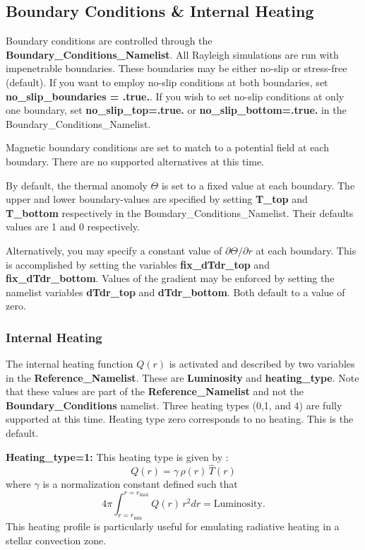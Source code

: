 \subsection{Boundary Conditions \& Internal Heating}\label{sec:boundary_conditions}
Boundary conditions are controlled through the \textbf{Boundary\_Conditions\_Namelist}. All Rayleigh simulations are run with impenetrable boundaries. These boundaries may be either no-slip or stress-free (default).  If you want to employ no-slip conditions at both boundaries, set \textbf{no\_slip\_boundaries = .true.}.  If you wish to set no-slip conditions at only one boundary, set \textbf{no\_slip\_top=.true.} or \textbf{no\_slip\_bottom=.true.} in the Boundary\_Conditions\_Namelist. 

Magnetic boundary conditions are set to match to a potential field at each boundary.  There are no supported alternatives at this time.

By default, the thermal anomoly $\Theta$ is set to a fixed value at each boundary.   The upper and lower boundary-values are specified by setting \textbf{T\_top} and \textbf{T\_bottom} respectively in the Boundary\_Conditions\_Namelist.  Their defaults values are 1 and 0 respectively.

Alternatively, you may specify a constant value of $\partial\Theta/\partial r$ at each boundary.  This is accomplished by setting the variables \textbf{fix\_dTdr\_top} and \textbf{fix\_dTdr\_bottom}.   Values of the gradient may be enforced by setting the namelist variables \textbf{dTdr\_top} and \textbf{dTdr\_bottom}.  Both default to a value of zero.
\subsubsection{Internal Heating}
The internal heating function $Q(r)$ is activated and described by two variables in the \textbf{Reference\_Namelist}.   These are \textbf{Luminosity} and \textbf{heating\_type}.  Note that these values are part of the \textbf{Reference\_Namelist} and not the \textbf{Boundary\_Conditions} namelist.  Three heating types (0,1, and 4) are fully supported at this time. Heating type zero corresponds to no heating.  This is the default.  


\textbf{Heating\_type=1:}
This heating type is given by :
\begin{equation}
\label{eq:heating}
Q(r)= \gamma\,\hat{\rho}(r)\, \hat{T}(r) 
\end{equation}
where $\gamma$ is a normalization constant defined such that 
\begin{equation}
\label{eq:lum}
4\pi\int_{r=r_\mathrm{min}}^{r=r_\mathrm{max}} Q(r)\,  r^2 dr = \mathrm{Luminosity}.
\end{equation}
This heating profile is particularly useful for emulating radiative heating in a stellar convection zone.

